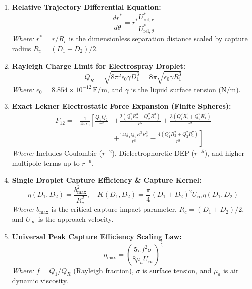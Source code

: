 \documentclass[11pt,a4paper]{article}
\begin{document}
\begin{enumerate}[label=\textbf{Equation \arabic* ---}, itemsep=1.5em, leftmargin=*]
  \item \textbf{Relative Trajectory Differential Equation:}
  \begin{equation}
  \frac{d r^*}{d \theta} = r^* \frac{U_{\text{rel},r}^*}{U_{\text{rel},\theta}^*}
  \end{equation}
  \textit{Where:} $r^* = r / R_c$ is the dimensionless separation distance scaled by capture radius $R_c = (D_1 + D_2)/2$.

  \item \textbf{Rayleigh Charge Limit for Electrospray Droplet:}
  \begin{equation}
  Q_R = \sqrt{8 \pi^2 \epsilon_0 \gamma D_1^3} = 8 \pi \sqrt{\epsilon_0 \gamma R_1^3}
  \end{equation}
  \textit{Where:} $\epsilon_0 = 8.854 \times 10^{-12} \, \text{F/m}$, and $\gamma$ is the liquid surface tension ($\text{N/m}$).

  \item \textbf{Exact Lekner Electrostatic Force Expansion (Finite Spheres):}
  \begin{equation}
  \begin{aligned}
  F_{12} = -\frac{1}{4\pi\epsilon_0} \left[ \frac{Q_1 Q_2}{r^2} \right. &+ \frac{2(Q_1^2 R_2^3 + Q_2^2 R_1^3)}{r^5} + \frac{3(Q_1^2 R_2^5 + Q_2^2 R_1^5)}{r^7} \\
  &+\left. \frac{14 Q_1 Q_2 R_1^3 R_2^3}{r^8} - \frac{4(Q_1^2 R_2^7 + Q_2^2 R_1^7)}{r^9} \right]
  \end{aligned}
  \end{equation}
  \textit{Where:} Includes Coulombic ($r^{-2}$), Dielectrophoretic DEP ($r^{-5}$), and higher multipole terms up to $r^{-9}$.

  \item \textbf{Single Droplet Capture Efficiency \& Capture Kernel:}
  \begin{equation}
  \eta(D_1, D_2) = \frac{b_{\text{max}}^2}{R_c^2}, \quad K(D_1, D_2) = \frac{\pi}{4} (D_1 + D_2)^2 U_\infty \eta(D_1, D_2)
  \end{equation}
  \textit{Where:} $b_{\text{max}}$ is the critical capture impact parameter, $R_c = (D_1 + D_2)/2$, and $U_\infty$ is the approach velocity.

  \item \textbf{Universal Peak Capture Efficiency Scaling Law:}
  \begin{equation}
  \eta_{\text{max}} = \left( \frac{5 \pi f^2 \sigma}{8 \mu_a U_\infty} \right)^{\frac{2}{5}}
  \end{equation}
  \textit{Where:} $f = Q_1 / Q_R$ (Rayleigh fraction), $\sigma$ is surface tension, and $\mu_a$ is air dynamic viscosity.


\end{enumerate}
\end{document}
